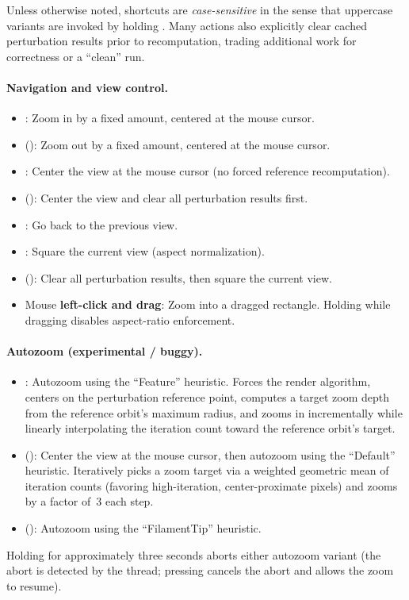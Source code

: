 Unless otherwise noted, shortcuts are \emph{case-sensitive} in the sense that
uppercase variants are invoked by holding .  Many actions also
explicitly clear cached perturbation results prior to recomputation, trading
additional work for correctness or a ``clean'' run.

\paragraph{Navigation and view control.}
\begin{itemize}
  \item {}: Zoom in by a fixed amount, centered at the mouse cursor.
  \item {} (): Zoom out by a fixed amount, centered at the mouse cursor.
  \item {}: Center the view at the mouse cursor (no forced reference recomputation).
  \item {} (): Center the view and clear all perturbation results first.
  \item {}: Go back to the previous view.
  \item {}: Square the current view (aspect normalization).
  \item {} (): Clear all perturbation results, then square the current view.
  \item Mouse \textbf{left-click and drag}: Zoom into a dragged rectangle.
        Holding  while dragging disables aspect-ratio enforcement.
\end{itemize}

\paragraph{Autozoom (experimental / buggy).}
\label{par:autozoom}

\begin{itemize}
  \item {}: Autozoom using the ``Feature'' heuristic.  Forces the
         render algorithm, centers on the
        perturbation reference point, computes a target zoom depth from the
        reference orbit's maximum radius, and zooms in incrementally while
        linearly interpolating the iteration count toward the reference orbit's
        target.
  \item {} (): Center the view at the mouse cursor, then
        autozoom using the ``Default'' heuristic.  Iteratively picks
        a zoom target via a weighted geometric mean of iteration counts
        (favoring high-iteration, center-proximate pixels) and zooms by a
        factor of~3 each step.
  \item {} (): Autozoom using the ``FilamentTip'' heuristic.
\end{itemize}
Holding  for approximately three seconds aborts either
autozoom variant (the abort is detected by the  thread;
pressing  cancels the abort and allows the zoom to resume).

